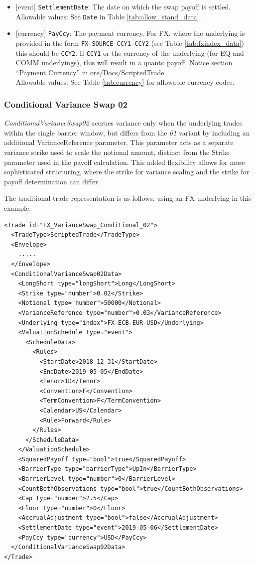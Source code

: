 \begin{itemize}
  \item{}[event] \lstinline!SettlementDate!: The date on which the swap payoff is settled. \\
  Allowable values: See \lstinline!Date! in Table \ref{tab:allow_stand_data}.
  \item{}[currency] \lstinline!PayCcy!: The payment currency. For FX, where the underlying is provided
      in the form \lstinline!FX-SOURCE-CCY1-CCY2! (see Table \ref{tab:fxindex_data}) this should
      be \lstinline!CCY2!. If \lstinline!CCY1! or the currency of the underlying (for EQ and
      COMM underlyings), this will result in a quanto payoff. Notice section ``Payment Currency'' in ore/Docs/ScriptedTrade. \\
        Allowable values: See Table \ref{tab:currency} for allowable currency codes.
\end{itemize}

\subsubsection{Conditional Variance Swap 02}

\emph{ConditionalVarianceSwap02} accrues variance only when the underlying trades within the single barrier window, but differs from the \emph{01} variant by including an
additional VarianceReference parameter. This parameter acts as a separate variance strike used to scale the notional amount, distinct
from the Strike parameter used in the payoff calculation. This added flexibility allows for more sophisticated structuring, where the
strike for variance scaling and the strike for payoff determination can differ.

The traditional trade representation is as follows, using an FX underlying in this example:

\begin{verbatim}
<Trade id="FX_VarianceSwap_Conditional_02">
  <TradeType>ScriptedTrade</TradeType>
  <Envelope>
    .....
  </Envelope>
  <ConditionalVarianceSwap02Data>
    <LongShort type="longShort">Long</LongShort>
    <Strike type="number">0.02</Strike>
    <Notional type="number">50000</Notional>
    <VarianceReference type="number">0.03</VarianceReference>
    <Underlying type="index">FX-ECB-EUR-USD</Underlying>
    <ValuationSchedule type="event">
      <ScheduleData>
        <Rules>
          <StartDate>2018-12-31</StartDate>
          <EndDate>2019-05-05</EndDate>
          <Tenor>1D</Tenor>
          <Convention>F</Convention>
          <TermConvention>F</TermConvention>
          <Calendar>US</Calendar>
          <Rule>Forward</Rule>
        </Rules>
      </ScheduleData>
    </ValuationSchedule>
    <SquaredPayoff type="bool">true</SquaredPayoff>
    <BarrierType type="barrierType">UpIn</BarrierType>
    <BarrierLevel type="number">0</BarrierLevel>
    <CountBothObservations type="bool">true</CountBothObservations>
    <Cap type="number">2.5</Cap>
    <Floor type="number">0</Floor>
    <AccrualAdjustment type="bool">false</AccrualAdjustment>
    <SettlementDate type="event">2019-05-06</SettlementDate>
    <PayCcy type="currency">USD</PayCcy>
  </ConditionalVarianceSwap02Data>
</Trade>
\end{verbatim}

